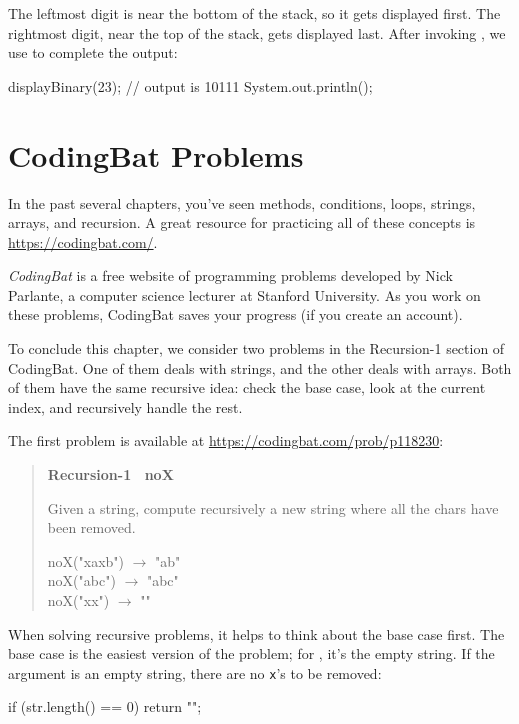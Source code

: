 The leftmost digit is near the bottom of the stack, so it gets displayed first.
The rightmost digit, near the top of the stack, gets displayed last.
After invoking , we use  to complete the output:

\begin{code}
displayBinary(23);      // output is 10111
System.out.println();
\end{code}


\section{CodingBat Problems}

In the past several chapters, you've seen methods, conditions, loops, strings, arrays, and recursion.
A great resource for practicing all of these concepts is \url{https://codingbat.com/}.


{\it CodingBat} is a free website of programming problems developed by Nick Parlante, a computer science lecturer at Stanford University.
As you work on these problems, CodingBat saves your progress (if you create an account).

To conclude this chapter, we consider two problems in the {\sf Recursion-1} section of CodingBat.
One of them deals with strings, and the other deals with arrays.
Both of them have the same recursive idea: check the base case, look at the current index, and recursively handle the rest.

The first problem is available at \url{https://codingbat.com/prob/p118230}:

\begin{quote}
\textbf{Recursion-1 ~noX}

Given a string, compute recursively a new string where all the  chars have been removed.

\ttfamily
noX("xaxb") $\rightarrow$ "ab" \\
noX("abc") $\rightarrow$ "abc" \\
noX("xx") $\rightarrow$ ""
\end{quote}

When solving recursive problems, it helps to think about the base case first.
The base case is the easiest version of the problem; for , it's the empty string.
If the argument is an empty string, there are no {\tt x}'s to be removed:

\begin{code}
if (str.length() == 0) {
    return "";
}
\end{code}

